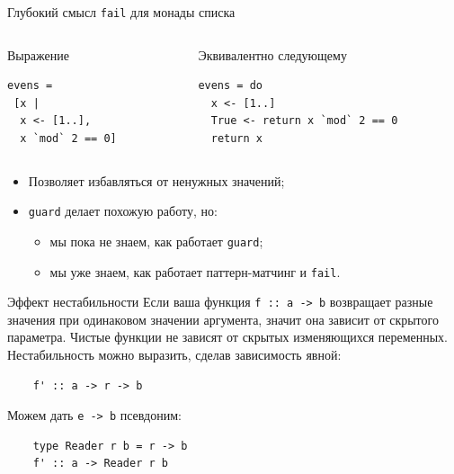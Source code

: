 \documentclass{beamer}
\newcommand{\hs}[1]{\texttt{#1}}
\begin{document}
\begin{frame}[fragile]{Глубокий смысл \texttt{fail} для монады списка}
    \begin{columns}
    \begin{column}{0.4\textwidth}
\begin{block}{Выражение}
\begin{verbatim}
evens =
 [x |
  x <- [1..],
  x `mod` 2 == 0]
\end{verbatim}
\end{block}
    \end{column}
    \begin{column}{0.6\textwidth}
\begin{block}{Эквивалентно следующему}
\begin{verbatim}
evens = do
  x <- [1..]
  True <- return x `mod` 2 == 0
  return x
\end{verbatim}
\end{block}
    \end{column}
    \end{columns}
    \begin{itemize}
        \item Позволяет избавляться от ненужных значений;
        \item \texttt{guard} делает похожую работу, но:
          \begin{itemize}
              \item мы пока не знаем, как работает \texttt{guard};
              \item мы уже знаем, как работает паттерн-матчинг и \texttt{fail}.
          \end{itemize}
    \end{itemize}
\end{frame}
\begin{frame}[fragile]{Эффект нестабильности}
    Если ваша функция \hs{f :: a -> b} возвращает разные значения при одинаковом значении аргумента, значит она зависит от скрытого параметра.
    \pause\newline\newline
    Чистые функции не зависят от скрытых изменяющихся переменных. Нестабильность можно
    выразить, сделав зависимость явной:
\begin{verbatim}
    f' :: a -> r -> b
\end{verbatim}
    \pause
    Можем дать \hs{e -> b} псевдоним:
\begin{verbatim}
    type Reader r b = r -> b
    f' :: a -> Reader r b
\end{verbatim}
\end{frame}
\end{document}
